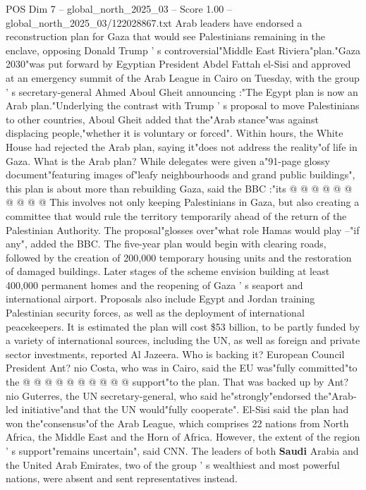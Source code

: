 \begin{textsample}{POS Dim 7 – global\_north\_2025\_03 – Score 1.00 – global\_north\_2025\_03/122028867.txt}  \label{ex:f7_pos_327}
Arab leaders have endorsed a reconstruction plan for Gaza that would see Palestinians remaining in the enclave, opposing Donald Trump ' s controversial"Middle East Riviera"plan."Gaza 2030"was put forward by Egyptian President Abdel Fattah el-Sisi and approved at an emergency summit of the Arab League in Cairo on Tuesday, with the group ' s secretary-general Ahmed Aboul Gheit announcing :"The Egypt plan is now an Arab plan."Underlying the contrast with Trump ' s proposal to move Palestinians to other countries, Aboul Gheit added that the"Arab stance"was against displacing people,"whether it is voluntary or forced".
Within hours, the White House had rejected the Arab plan, saying it"does not address the reality"of life in Gaza.
What is the Arab plan?
While delegates were given a"91-page glossy document"featuring images of"leafy neighbourhoods and grand public buildings", this plan is about more than rebuilding Gaza, said the BBC :"its @ @ @ @ @ @ @ @ @ @ This involves not only keeping Palestinians in Gaza, but also creating a committee that would rule the territory temporarily ahead of the return of the Palestinian Authority.
The proposal"glosses over"what role Hamas would play --"if any", added the BBC.
The five-year plan would begin with clearing roads, followed by the creation of 200,000 temporary housing units and the restoration of damaged buildings.
Later stages of the scheme envision building at least 400,000 permanent homes and the reopening of Gaza ' s seaport and international airport.
Proposals also include Egypt and Jordan training Palestinian security forces, as well as the deployment of international peacekeepers.
It is estimated the plan will cost \$53 billion, to be partly funded by a variety of international sources, including the UN, as well as foreign and private sector investments, reported Al Jazeera.
Who is backing it?
European Council President Ant? nio Costa, who was in Cairo, said the EU was"fully committed"to the @ @ @ @ @ @ @ @ @ @ support"to the plan.
That was backed up by Ant? nio Guterres, the UN secretary-general, who said he"strongly"endorsed the"Arab-led initiative"and that the UN would"fully cooperate".
El-Sisi said the plan had won the"consensus"of the Arab League, which comprises 22 nations from North Africa, the Middle East and the Horn of Africa.
However, the extent of the region ' s support"remains uncertain", said CNN.
The leaders of both \textbf{Saudi} Arabia and the United Arab Emirates, two of the group ' s wealthiest and most powerful nations, were absent and sent representatives instead.

\end{textsample}

